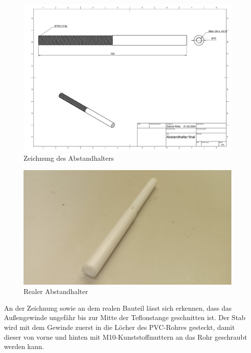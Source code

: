 \begin{figure}[h!]
	\centering
	\includegraphics[width=\textwidth]{../ref/Abstandhalter final Zeichnung v2.pdf}
	\caption{Zeichnung des Abstandhalters}
	\label{fig:Abstandhalter-Zeichnung}
\end{figure}

\begin{figure}[h!]
	\centering
	\includegraphics[width=\textwidth]{../ref/Abstandhalter-real.jpg}
	\caption{Realer Abstandhalter}
	\label{fig:Abstandhalter-real}
\end{figure}

An der Zeichnung sowie an dem realen Bauteil lässt sich erkennen, dass das Außengewinde ungefähr bis zur Mitte der Teflonstange geschnitten ist. Der Stab wird mit dem Gewinde zuerst in die Löcher des PVC-Rohres gesteckt, damit dieser von vorne und hinten mit M10-Kunststoffmuttern an das Rohr geschraubt werden kann.

